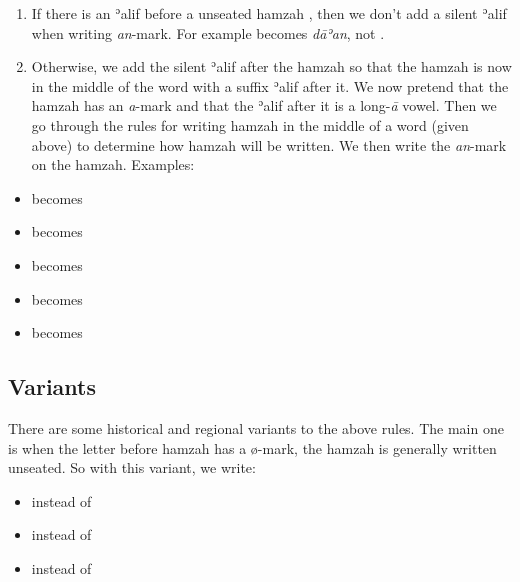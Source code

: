 \documentclass[
  10pt,
]{book}
\providecommand{\tightlist}{%
  \setlength{\itemsep}{0pt}\setlength{\parskip}{0pt}}
\begin{document}
\begin{enumerate}
\def\labelenumi{\arabic{enumi}.}
\item
  If there is an ʾalif before a unseated hamzah {}, then we don't add a silent ʾalif when writing \emph{an}-mark. For example {} becomes {} \emph{dāʾan}, not {}.
\item
  Otherwise, we add the silent ʾalif after the hamzah so that the hamzah is now in the middle of the word with a suffix ʾalif after it. We now pretend that the hamzah has an \emph{a}-mark and that the ʾalif after it is a long-\emph{ā} vowel. Then we go through the rules for writing hamzah in the middle of a word (given above) to determine how hamzah will be written. We then write the \emph{an}-mark on the hamzah. Examples:
\end{enumerate}

\begin{itemize}
\tightlist
\item
  \vphantom{\huge J} {} becomes {}
\item
  \vphantom{\huge J} {} becomes {}
\item
  \vphantom{\huge J} {} becomes {}
\item
  \vphantom{\huge J} {} becomes {}
\item
  \vphantom{\huge J} {} becomes {}
\end{itemize}

\subsection{Variants}\label{hamza-variants}

There are some historical and regional variants to the above rules. The main one is when the letter before hamzah has a ø-mark, the hamzah is generally written unseated. So with this variant, we write:

\begin{itemize}
\tightlist
\item
  \vphantom{\huge J} {} instead of {}
\item
  \vphantom{\huge J} {} instead of {}
\item
  \vphantom{\huge J} {} instead of {}
\end{itemize}
\end{document}
